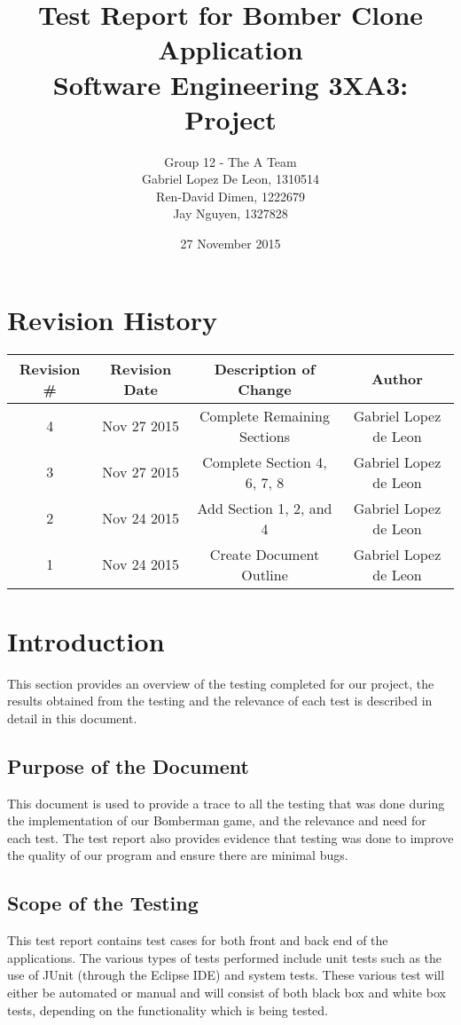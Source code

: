\documentclass[12pt, letterpaper]{article}
\title{\textbf{Test Report for Bomber Clone Application \\ \Large Software Engineering 3XA3: Project}}
\author{Group 12 - The A Team \\Gabriel Lopez De Leon, 1310514\\Ren-David Dimen, 1222679\\Jay Nguyen, 1327828}
\date{27 November 2015}
\begin{document}
	
	\begin{titlepage}
		\clearpage\maketitle
		\thispagestyle{empty}
	\end{titlepage}
	
	\newpage
	\tableofcontents
	\newpage
	
\section{Revision History}
	\begin{tabular}{ |c|c|c|c| } 
		\hline
		\textbf{Revision \#} & \textbf{Revision Date} & \textbf{Description of Change} & \textbf{Author}\\
		\hline
		4 & Nov 27 2015 & Complete Remaining Sections & Gabriel Lopez de Leon\\
		\hline
		3 & Nov 27 2015 & Complete Section 4, 6, 7, 8 & Gabriel Lopez de Leon\\
		\hline
		2 & Nov 24 2015 & Add Section 1, 2, and 4 & Gabriel Lopez de Leon\\
		\hline
		1 & Nov 24 2015 & Create Document Outline & Gabriel Lopez de Leon\\
		\hline
	\end{tabular}
	\newpage
	
\section{Introduction}
\indent \indent This section provides an overview of the testing completed for our project, the results obtained from the testing and the relevance of each test is described in detail in this document.
\subsection{Purpose of the Document}
\indent \indent This document is used to provide a trace to all the testing that was done during the implementation of our Bomberman game, and the relevance and need for each test. The test report also provides evidence that testing was done to improve the quality of our program and ensure there are minimal bugs.
\subsection{Scope of the Testing}
\indent \indent This test report contains test cases for both front and back end of the applications. The various types of tests performed include unit tests such as the use of JUnit (through the Eclipse IDE) and system tests. These various test will either be automated or manual and will consist of both black box and white box tests, depending on the functionality which is being tested.
\end{document}
